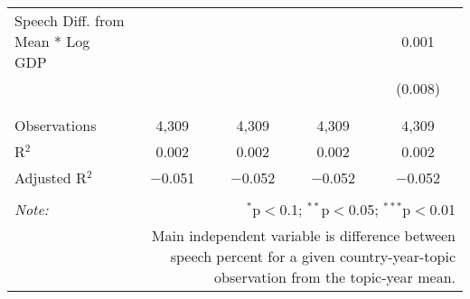 \begin{table}[!htbp]
\begin{tabular}{@{\extracolsep{5pt}}lcccc}
 Speech Diff. from Mean * Log GDP &  &  &  & 0.001 \\ 
  &  &  &  & (0.008) \\ 
  & & & & \\ 
\hline \\[-1.8ex] 
Observations & 4,309 & 4,309 & 4,309 & 4,309 \\ 
R$^{2}$ & 0.002 & 0.002 & 0.002 & 0.002 \\ 
Adjusted R$^{2}$ & $-$0.051 & $-$0.052 & $-$0.052 & $-$0.052 \\ 
\hline 
\hline \\[-1.8ex] 
\textit{Note:}  & \multicolumn{4}{r}{$^{*}$p$<$0.1; $^{**}$p$<$0.05; $^{***}$p$<$0.01} \\ 
 & \multicolumn{4}{r}{Main independent variable is difference between speech percent for a given country-year-topic observation from the topic-year mean.} \\ 
\end{tabular} 
\end{table} 
